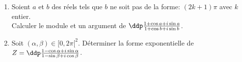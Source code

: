 
\begin{exercice}  \;
\begin{enumerate}
\item Soient $a$ et $b$ des r\'eels tels que $b$ ne soit pas de la forme: $(2k+1)\pi$ avec $k$ entier.\\
\noindent Calculer le module et un argument de $\ddp\frac{1+\cos{a}+i\sin{a}}{1+\cos{b}+i\sin{b}}$.
\item Soit $(\alpha,\beta)\in\lbrack 0,2\pi\lbrack^2$. D\'eterminer la forme exponentielle de $Z=\ddp\frac{1-\cos \alpha +i\sin \alpha }{1-\sin \beta +i\cos \beta}$.
\end{enumerate}
\end{exercice}